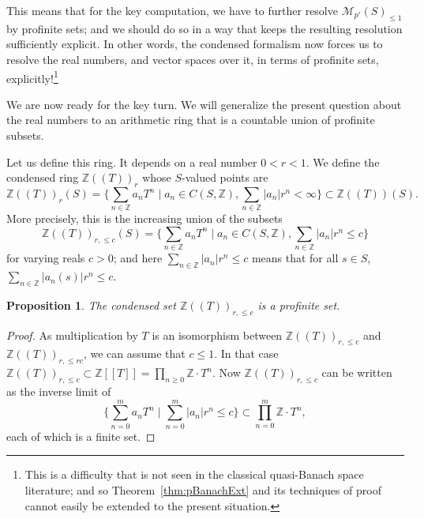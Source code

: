\documentclass[11pt]{amsbook}
\numberwithin{equation}{section}
\numberwithin{theorem}{section}
\newtheorem{proposition}[theorem]{Proposition}
\theoremstyle{definition}
\begin{document}
This means that for the key computation, we have to further resolve $\mathcal M_{p'}(S)_{\leq 1}$ by profinite sets; and we should do so in a way that keeps the resulting resolution sufficiently explicit. In other words, the condensed formalism now forces us to resolve the real numbers, and vector spaces over it, in terms of profinite sets, explicitly!\footnote{This is a difficulty that is not seen in the classical quasi-Banach space literature; and so Theorem~\ref{thm:pBanachExt} and its techniques of proof cannot easily be extended to the present situation.}

We are now ready for the key turn. We will generalize the present question about the real numbers to an arithmetic ring that is a countable union of profinite subsets.

Let us define this ring. It depends on a real number $0<r<1$. We define the condensed ring $\mathbb Z((T))_r$ whose $S$-valued points are
\[
\mathbb Z((T))_r(S) = \{\sum_{n\in \mathbb Z} a_n T^n\mid a_n\in C(S,\mathbb Z), \sum_{n\in \mathbb Z} |a_n|r^n<\infty\}\subset \mathbb Z((T))(S).
\]
More precisely, this is the increasing union of the subsets
\[
\mathbb Z((T))_{r,\leq c}(S) = \{\sum_{n\in \mathbb Z} a_n T^n\mid a_n\in C(S,\mathbb Z), \sum_{n\in \mathbb Z} |a_n|r^n\leq c\}
\]
for varying reals $c>0$; and here $\sum_{n\in \mathbb Z} |a_n|r^n\leq c$ means that for all $s\in S$, $\sum_{n\in \mathbb Z} |a_n(s)|r^n\leq c$.

\begin{proposition} The condensed set $\mathbb Z((T))_{r,\leq c}$ is a profinite set.
\end{proposition}

\begin{proof} As multiplication by $T$ is an isomorphism between $\mathbb Z((T))_{r,\leq c}$ and $\mathbb Z((T))_{r,\leq rc}$, we can assume that $c\leq 1$. In that case $\mathbb Z((T))_{r,\leq c}\subset \mathbb Z[[T]]=\prod_{n\geq 0} \mathbb Z\cdot T^n$. Now $\mathbb Z((T))_{r,\leq c}$ can be written as the inverse limit of
\[
\{\sum_{n=0}^m a_n T^n\mid \sum_{n=0}^m |a_n|r^n\leq c\}\subset \prod_{n=0}^m \mathbb Z\cdot T^n,
\]
each of which is a finite set.
\end{proof}
\end{document}

